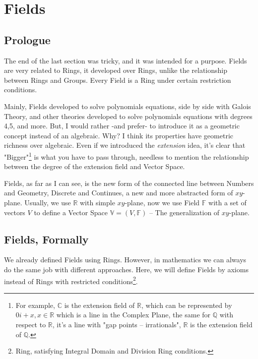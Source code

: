 \section{Fields \label{fields}}

\subsection{Prologue}
The end of the last section was tricky, and it was intended for a purpose. Fields are very related to Rings, it developed over Rings, unlike the relationship between Rings and Groups. Every Field is a Ring under certain restriction conditions.

Mainly, Fields developed to solve polynomials equations, side by side with Galois Theory, and other theories developed to solve polynomials equations with degrees 4,5, and more. But, I would rather -and prefer- to introduce it as a geometric concept instead of an algebraic. Why? I think its properties have geometric richness over algebraic. Even if we introduced the {\it extension} idea, it's clear that "Bigger"\footnote{For example, $\mathbb{C}$ is the extension field of $\mathbb{R}$, which can be represented by $0i+x, x \in \mathbb{R}$ which is a line in the Complex Plane, the same for $\mathbb{Q}$ with respect to $\mathbb{R}$, it's a line with "gap points -- irrationals", $\mathbb{R}$ is the extension field of $\mathbb{Q}$.  } is what you have to pass through, needless to mention the relationship between the degree of the extension field and Vector Space.

Fields, as far as I can see, is the new form of the connected line between Numbers and Geometry, Discrete and Continues, a new and more abstracted form of $xy$-plane. Usually, we use $\mathbb{R}$ with simple $xy$-plane, now we use Field $\mathbb{F}$ with a set of vectors $V$ to define a Vector Space $\mathbb{V}= (V, \mathbb{F})$ -- The generalization of $xy$-plane.

\subsection{Fields, Formally}
We already defined Fields using Rings. However, in mathematics we can always do the same job with different approaches. Here, we will define Fields by axioms instead of Rings with restricted conditions\footnote{Ring, satisfying Integral Domain and Division Ring conditions.}.

